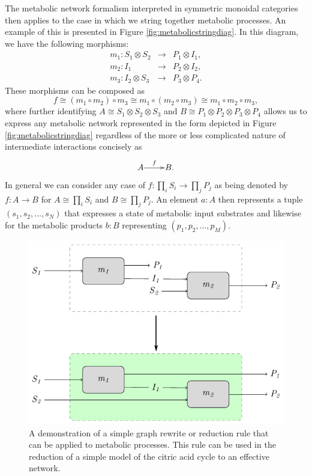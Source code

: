 The metabolic network formalism interpreted in symmetric monoidal categories then applies to the case in which we string together metabolic processes. An example of this is presented in Figure \ref{fig:metabolicstringdiag}. In this diagram, we have the following morphisms:
\begin{eqnarray*}
m_1 \colon S_1 \otimes S_2 &\longrightarrow& P_1 \otimes I_1,\\
m_2 \colon I_1 &\longrightarrow& P_2 \otimes I_2,\\
m_3 \colon I_2 \otimes S_3 &\longrightarrow& P_3 \otimes P_4.
\end{eqnarray*}
These morphisms can be composed as 
$$
f \cong (m_1 \circ m_2) \circ m_3 \cong m_1 \circ (m_2 \circ m_3) \cong m_1 \circ m_2 \circ m_3,
$$
where further identifying $A \cong S_1 \otimes S_2 \otimes S_3$ and $B \cong P_1 \otimes P_2 \otimes P_3 \otimes P_4$ allows us to express any metabolic network represented in the form depicted in Figure \ref{fig:metabolicstringdiag} regardless of the more or less complicated nature of intermediate interactions concisely as
$$
\xymatrix@1{
	A\ar[r]^-{f} & B.
	}
$$
In general we can consider any case of $f \colon \prod_i S_i \rightarrow \prod_j P_j$ as being denoted by $f \colon A \rightarrow B$ for $A \cong \prod_i S_i$ and $B \cong \prod_j P_j$. An element $a \colon A$ then represents a tuple $(s_1, s_2, \ldots, s_N)$ that expresses a state of metabolic input substrates and likewise for the metabolic products $b \colon B$ representing $(p_1, p_2, \ldots, p_M)$.

\begin{figure}
\begin{center}
\noindent\includegraphics[width=0.5\columnwidth]{fig/blockassoclaw.pdf}
\end{center}
\caption{A demonstration of a simple graph rewrite or reduction rule that can be applied to metabolic processes. This rule can be used in the reduction of a simple model of the citric acid cycle to an effective network.}
\label{fig:stringassoclaw}
\end{figure}

